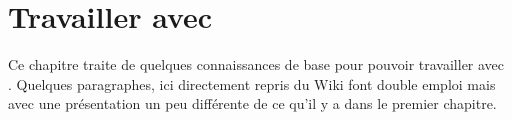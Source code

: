 \chapter{Travailler avec \codeblocks}

Ce chapitre traite de quelques connaissances de base pour pouvoir travailler avec \codeblocks. Quelques paragraphes, ici directement repris du Wiki font double emploi mais avec une présentation un peu différente de ce qu'il y a dans le premier chapitre.

\begin{BUILDPROCESS}

\end{BUILDPROCESS}

\begin{CREATEPROJECT}

\end{CREATEPROJECT}

\begin{DEBUGGING}

\end{DEBUGGING}

\begin{DEBUGGERSCRIPTS}

\end{DEBUGGERSCRIPTS}

\begin{MAKEFILES}

\end{MAKEFILES}

\begin{CBP2MAKE}

\end{CBP2MAKE}

\begin{INTERNATIONALIZATION}

\end{INTERNATIONALIZATION}

\begin{ADDINGLANGUAGES}

\end{ADDINGLANGUAGES}

\begin{VARIABLESTYPES}

\end{VARIABLESTYPES}

\begin{FILEFORMAT}

\end{FILEFORMAT}

